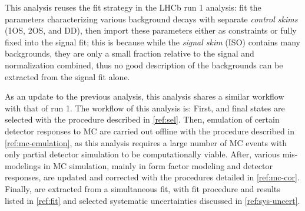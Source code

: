 
This analysis reuses the fit strategy in the LHCb \RDX run 1 analysis:
fit the parameters characterizing various background decays with separate
\emph{control skims} (1OS, 2OS, and DD),
then import these parameters either as constraints or fully fixed into the
signal fit;
this is because while the \emph{signal skim} (ISO) contains many
backgrounds,
they are only a small fraction relative to the signal and normalization
combined,
thus no good description of the backgrounds can be extracted from the signal fit
alone.


As an update to the previous analysis, this analysis shares a similar
workflow with that of run 1.
The workflow of this analysis is:
First, \Dstarp\mun and \Dz\mun final states are selected with the procedure
described in \cref{ref:sel}.
Then, emulation of certain detector responses to MC are carried out offline
with the procedure described in
\cref{ref:mc-emulation},
as this analysis requires a large number of MC events with only partial detector
simulation to be computationally viable.
After, various mis-modelings in MC simulation,
mainly in form factor modeling and detector responses, are updated and
corrected with the procedures detailed in \cref{ref:mc-cor}.
Finally, \RDX are extracted from a simultaneous fit, with fit procedure and
results listed in \cref{ref:fit}
and selected systematic uncertainties discussed in
\cref{ref:sys-uncert}.


